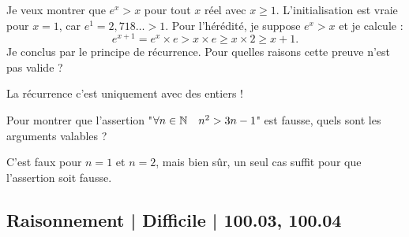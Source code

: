 \begin{question}

Je veux montrer que $e^x > x$ pour tout $x$ réel avec $x \ge 1$.
L'initialisation est vraie pour $x=1$, car $e^1 = 2,718\ldots >1$.
Pour l'hérédité, je suppose $e^x>x$ et je calcule :
$$e^{x+1} = e^x \times e > x  \times e \ge x \times 2 \ge x + 1.$$
Je conclus par le principe de récurrence.
Pour quelles raisons cette preuve n'est pas valide ?
\begin{answers}

    

\end{answers}
\begin{explanations}
La récurrence c'est uniquement avec des entiers !
\end{explanations}
\end{question}


\begin{question}

Pour montrer que l'assertion 
"$\forall n \in \mathbb{N} \quad n^2 > 3n-1$" est fausse,
quels sont les arguments valables ?
\begin{answers}

    
    
\end{answers}
\begin{explanations}
C'est faux pour $n=1$ et $n=2$, mais bien sûr, un seul cas suffit pour que l'assertion soit fausse. 
\end{explanations}
\end{question}





\subsection{Raisonnement | Difficile | 100.03, 100.04}



